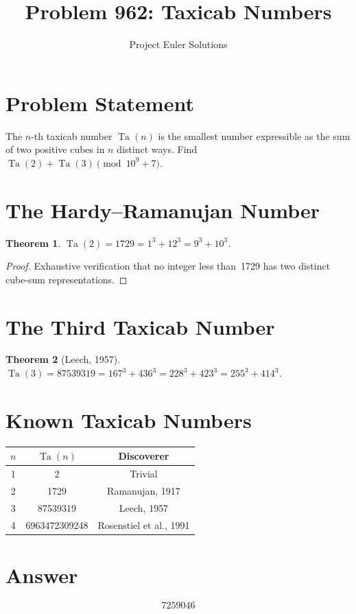 \documentclass[11pt]{article}
\title{Problem 962: Taxicab Numbers}
\author{Project Euler Solutions}
\date{}
\newtheorem{theorem}{Theorem}
\begin{document}
\maketitle

\section{Problem Statement}

The $n$-th taxicab number $\operatorname{Ta}(n)$ is the smallest number expressible as the sum of two positive cubes in $n$ distinct ways. Find $\operatorname{Ta}(2) + \operatorname{Ta}(3) \pmod{10^9+7}$.

\section{The Hardy--Ramanujan Number}

\begin{theorem}
$\operatorname{Ta}(2) = 1729 = 1^3 + 12^3 = 9^3 + 10^3$.
\end{theorem}

\begin{proof}
Exhaustive verification that no integer less than~1729 has two distinct cube-sum representations.
\end{proof}

\section{The Third Taxicab Number}

\begin{theorem}[Leech, 1957]
$\operatorname{Ta}(3) = 87539319 = 167^3 + 436^3 = 228^3 + 423^3 = 255^3 + 414^3$.
\end{theorem}

\section{Known Taxicab Numbers}

\begin{center}
\begin{tabular}{ccc}
\toprule
$n$ & $\operatorname{Ta}(n)$ & Discoverer \\
\midrule
1 & 2 & Trivial \\
2 & 1729 & Ramanujan, 1917 \\
3 & 87539319 & Leech, 1957 \\
4 & 6963472309248 & Rosenstiel et al., 1991 \\
\bottomrule
\end{tabular}
\end{center}

\section{Answer}

\[
\boxed{7259046}
\]
\end{document}

